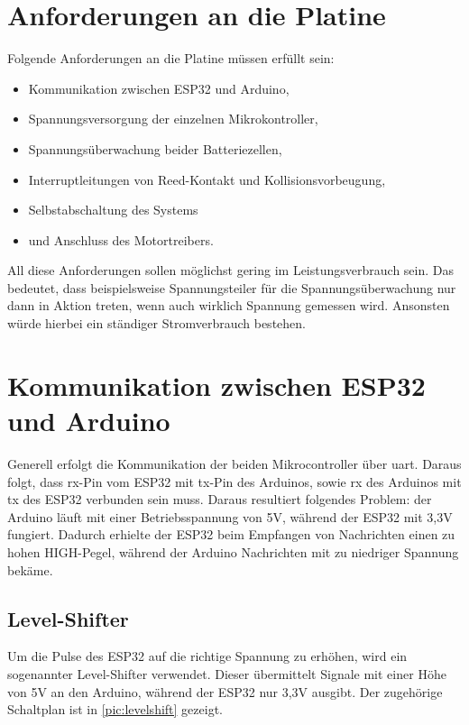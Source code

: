 \section{Anforderungen an die Platine}
Folgende Anforderungen an die Platine müssen erfüllt sein: 
\begin{center}
	\begin{itemize}
		\item Kommunikation zwischen ESP32 und Arduino,
		\item Spannungsversorgung der einzelnen Mikrokontroller,
		\item Spannungsüberwachung beider Batteriezellen,
		\item Interruptleitungen von Reed-Kontakt und Kollisionsvorbeugung,
		\item Selbstabschaltung des Systems
		\item und Anschluss des Motortreibers.
	\end{itemize}
\end{center}
All diese Anforderungen sollen möglichst gering im Leistungsverbrauch sein. Das bedeutet, dass beispielsweise Spannungsteiler für die Spannungsüberwachung nur dann in Aktion treten, wenn auch wirklich Spannung gemessen wird. Ansonsten würde hierbei ein ständiger Stromverbrauch bestehen.

\section{Kommunikation zwischen ESP32 und Arduino}
Generell erfolgt die Kommunikation der beiden Mikrocontroller über \acrshort{uart}. Daraus folgt, dass \acrfull{rx}-Pin vom ESP32 mit \acrfull{tx}-Pin des Arduinos, sowie \acrshort{rx} des Arduinos mit \acrshort{tx} des ESP32 verbunden sein muss. 
Daraus resultiert folgendes Problem: der Arduino läuft mit einer Betriebsspannung von 5V, während der ESP32 mit 3,3V fungiert. Dadurch erhielte der ESP32 beim Empfangen von Nachrichten einen zu hohen HIGH-Pegel, während der Arduino Nachrichten mit zu niedriger Spannung bekäme.

\subsection{Level-Shifter}
Um die Pulse des ESP32 auf die richtige Spannung zu erhöhen, wird ein sogenannter Level-Shifter verwendet. Dieser übermittelt Signale mit einer Höhe von 5V an den Arduino, während der ESP32 nur 3,3V ausgibt.
Der zugehörige Schaltplan ist in \autoref{pic:levelshift} gezeigt.
\vspace{1cm}

